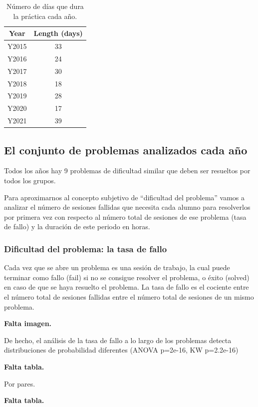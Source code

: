 \begin{table}[H]
\centering
\caption{Número de días que dura la práctica cada año.}
\label{tab:days}
\begin{tabular}{cc}
\hline
\textbf{Year}  & \textbf{Length (days)}  \\ \hline
Y2015 & 33 \\
Y2016 & 24 \\
Y2017 & 30 \\
Y2018 & 18 \\
Y2019 & 28 \\
Y2020 & 17 \\
Y2021 & 39 \\ \hline
\end{tabular}
\end{table}

\subsection{El conjunto de problemas analizados cada año}

Todos los años hay 9 problemas de dificultad similar que deben ser resueltos por todos los grupos.

Para aproximarnos al concepto subjetivo de ``dificultad del problema'' vamos a analizar el número de sesiones fallidas que necesita cada alumno para resolverlos por primera vez con respecto al número total de sesiones de ese problema (tasa de fallo) y la duración de este periodo en horas.

\subsubsection{Dificultad del problema: la tasa de fallo}

Cada vez que se abre un problema es una sesión de trabajo, la cual puede terminar como fallo (fail) si no se consigue resolver el problema, o éxito (solved) en caso de que se haya resuelto el problema. La tasa de fallo es el cociente entre el número total de sesiones fallidas entre el número total de sesiones de un mismo problema.

\textbf{Falta imagen.}

De hecho, el análisis de la tasa de fallo a lo largo de los problemas detecta distribuciones de probabilidad diferentes (ANOVA p=2e-16, KW p=2.2e-16)

\textbf{Falta tabla.}

Por pares.

\textbf{Falta tabla.}

